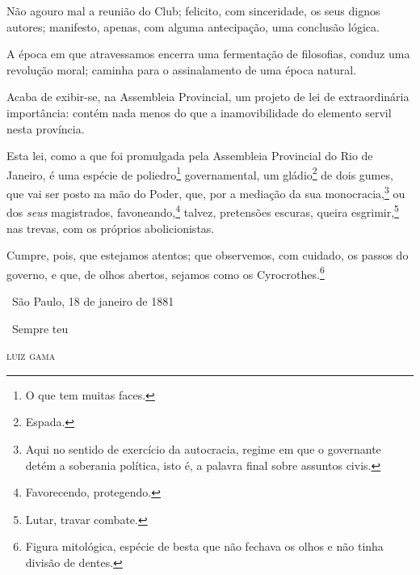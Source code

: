 Não agouro mal a reunião do Club; felicito, com sinceridade, os seus
dignos autores; manifesto, apenas, com alguma antecipação, uma conclusão
lógica.

A época em que atravessamos encerra uma fermentação de filosofias,
conduz uma revolução moral; caminha para o assinalamento de uma época
natural.

\asterisc

Acaba de exibir-se, na Assembleia Provincial, um projeto de lei de
extraordinária importância: contém nada menos do que a inamovibilidade
do elemento servil nesta província.

Esta lei, como a que foi promulgada pela Assembleia Provincial do Rio de
Janeiro, é uma espécie de poliedro\footnote{O que tem muitas faces.}
governamental, um gládio\footnote{Espada.} de dois gumes, que vai ser
posto na mão do Poder, que, por a mediação da sua monocracia,\footnote{
  Aqui no sentido de exercício da autocracia, regime em que o governante
  detém a soberania política, isto é, a palavra final sobre assuntos
  civis.} ou dos \emph{seus} magistrados, favoneando,\footnote{
  Favorecendo, protegendo.} talvez, pretensões escuras, queira
esgrimir,\footnote{Lutar, travar combate.} nas trevas, com os próprios
abolicionistas.

Cumpre, pois, que estejamos atentos; que observemos, com cuidado, os
passos do governo, e que, de olhos abertos, sejamos como os
Cyrocrothes.\footnote{Figura mitológica, espécie de besta que não 
  fechava os olhos e não tinha divisão de dentes.}\medskip

\hfill\ São Paulo, 18 de janeiro de 1881

\hfill\ Sempre teu

\hfill\textsc{luiz gama}


